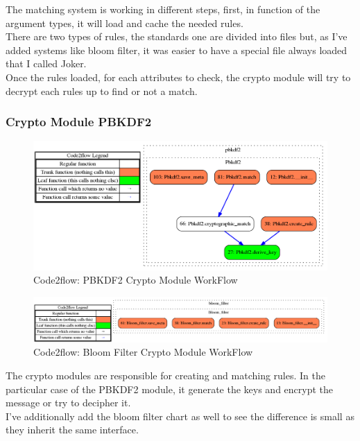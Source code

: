 \documentclass{eplmastersthesis}
\begin{document}
The matching system is working in different steps, first, in function of the argument types, it will load and cache the needed rules.\\
There are two types of rules, the standards one are divided into files but, as I've added systems like bloom filter, it was easier to have a special file always loaded that I called Joker.\\

Once the rules loaded, for each attributes to check, the crypto module will try to decrypt each rules up to find or not a match.

\subsubsection{Crypto Module PBKDF2}

\begin{figure}[h!]
\begin{center}
	\includegraphics[scale=0.3]{res/flowPBKDF2}
	\caption{Code2flow: PBKDF2 Crypto Module WorkFlow}
	\label{code2flow-pbkdf2}
\end{center}
\end{figure}

\begin{figure}[h!]
\begin{center}
	\includegraphics[scale=0.3]{res/flowBloomFilter}
	\caption{Code2flow: Bloom Filter Crypto Module WorkFlow}
	\label{code2flow-bloom}
\end{center}
\end{figure}

The crypto modules are responsible for creating and matching rules. In the particular case of the PBKDF2 module, it generate the keys and encrypt the message or try to decipher it.\\
I've additionally add the bloom filter chart as well to see the difference is small as they inherit the same interface.\\
\end{document}
